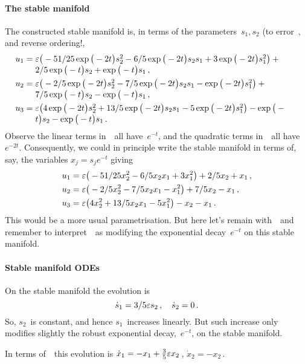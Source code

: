 \paragraph{The stable manifold} 
The constructed stable manifold is, in terms of the parameters~\(s_1,s_2\) (to error~, and reverse ordering!, 
\begin{align*}&
u_{1}=\ParMath{\eps \big(-51/25 \exp \big(-2 t\big) s_{2}^{2}-6/5 \exp \big(-2 t
\big) s_{2} s_{1}+3 \exp \big(-2 t\big) s_{1}^{2}\big)+2/5 \exp \big(-t
\big) s_{2}+\exp \big(-t\big) s_{1}
\,,}
\\&
u_{2}=\ParMath{\eps \big(-2/5 \exp \big(-2 t\big) s_{2}^{2}-7/5 \exp \big(-2 t
\big) s_{2} s_{1}-\exp \big(-2 t\big) s_{1}^{2}\big)+7/5 \exp \big(-t
\big) s_{2}-\exp \big(-t\big) s_{1}
\,,}
 \\&
u_{3}=\ParMath{\eps \big(4 \exp \big(-2 t\big) s_{2}^{2}+13/5 \exp \big(-2 t\big)
 s_{2} s_{1}-5 \exp \big(-2 t\big) s_{1}^{2}\big)-\exp \big(-t\big) s_{2
}-\exp \big(-t\big) s_{1}
\,.}
\end{align*}
Observe the linear terms in~\sv\ all have~\(e^{-t}\), and the quadratic terms in~\sv\ all have~\(e^{-2t}\).
Consequently, we could in principle write the stable manifold in terms of, say, the variables \(x_j=s_je^{-t}\) giving  
\begin{align*}&
u_{1}=\varepsilon \big(-51/25 x_{2}^{2}-6/5 x_{2} x_{1}+3 x_{1}^{2}\big)+2/5 x_{2}+x_{1}\,, 
\\&
u_{2}=\varepsilon \big(-2/5 x_{2}^{2}-7/5 x_{2} x_{1}- x_{1}^{2}\big)+7/5  x_{2}- x_{1}
\,, \\&
u_{3}=\varepsilon \big(4 x_{2}^{2}+13/5 x_{2} x_{1}-5 x_{1}^{2}\big)- x_{2
}- x_{1}\,.
\end{align*}
This would be a more usual parametrisation.  But here let's remain with~\sv\ and remember to interpret~\sv\ as modifying the exponential decay~\(e^{-t}\) on this stable manifold.


\paragraph{Stable manifold ODEs} 
On the stable manifold the evolution is
\begin{equation*}
\dot s_{1}=3/5 \varepsilon s_{2}\,,\quad
\dot s_{2}=0\,.
\end{equation*}
So, \(s_2\)~is constant, and hence \(s_1\)~increases linearly.  
But such increase only modifies slightly the robust exponential decay,~\(e^{-t}\), on the stable manifold. 

In terms of~\xv\ this evolution is \(\dot x_1=-x_1+\tfrac35\varepsilon x_2\)\,, \(\dot x_2=-x_2\)\,.

